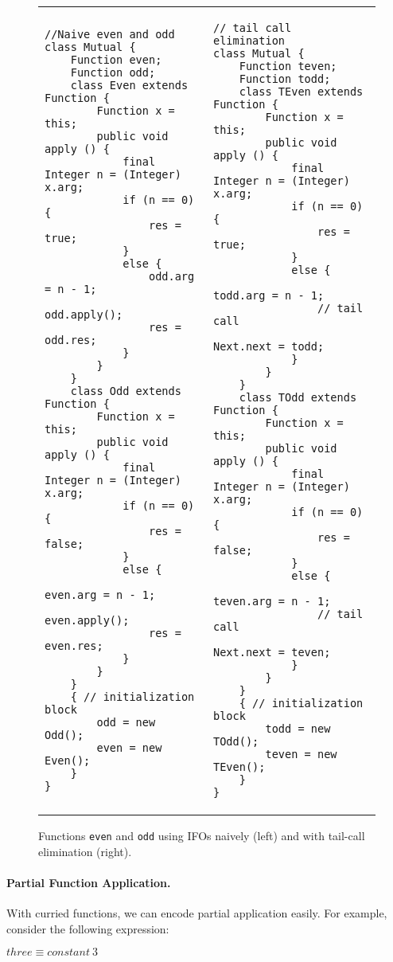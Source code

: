 \begin{figure*}
\begin{tabular}[t]{l l}
\hspace{30pt}\begin{lstlisting}
//Naive even and odd
class Mutual {
	Function even;
	Function odd;
	class Even extends Function {
		Function x = this;
		public void apply () {
			final Integer n = (Integer) x.arg;
			if (n == 0) {
				res = true;
			}
			else {
				odd.arg = n - 1;
				odd.apply();
				res = odd.res;
			}
		}
	}
	class Odd extends Function {
		Function x = this;
		public void apply () {
			final Integer n = (Integer) x.arg;
			if (n == 0) {
				res = false;
			}
			else {
				even.arg = n - 1;
				even.apply();
				res = even.res;
			}
		}
	}
	{ // initialization block
		odd = new Odd();
		even = new Even();
	}
}
\end{lstlisting}&
\hspace{70pt}\begin{lstlisting}
// tail call elimination
class Mutual {
	Function teven;
	Function todd;
	class TEven extends Function {
		Function x = this;
		public void apply () {
			final Integer n = (Integer) x.arg;
			if (n == 0) {
				res = true;
			}
			else {
				todd.arg = n - 1;
				// tail call
				Next.next = todd;
			}
		}
	}
	class TOdd extends Function {
		Function x = this;
		public void apply () {
			final Integer n = (Integer) x.arg;
			if (n == 0) {
				res = false;
			}
			else {
				teven.arg = n - 1;
				// tail call
				Next.next = teven;
			}
		}
	}
	{ // initialization block
		todd = new TOdd();
		teven = new TEven();
	}
}
\end{lstlisting}
\end{tabular}

\caption{Functions \lstinline{even} and \lstinline{odd} using IFOs naively (left) and with
  tail-call elimination (right).}

\label{fig:even}

\end{figure*}

\paragraph{Partial Function Application.} With curried functions, we can encode partial application easily.
For example, consider the following 
expression:

\vspace{5pt}
$three \equiv constant~3$
\vspace{5pt}

